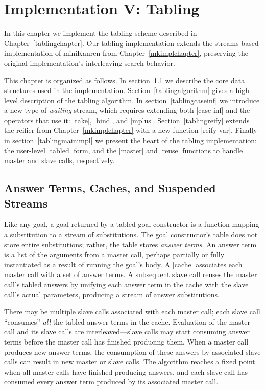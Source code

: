 \chapter{Implementation V: Tabling}\label{tablingimplchapter}

In this chapter we implement the tabling scheme described in
Chapter~\ref{tablingchapter}.  Our tabling implementation extends the
streams-based implementation of miniKanren from
Chapter~\ref{mkimplchapter}, preserving the original implementation's
interleaving search behavior.

This chapter is organized as follows.  In section~\ref{tablingrep} we
describe the core data structures used in the implementation.
Section~\ref{tablingalgorithm} gives a high-level description of the
tabling algorithm.  In section~\ref{tablingcaseinf} we introduce a new
type of \emph{waiting} stream, which requires extending both
\scheme|case-inf| and the operators that use it: \scheme|take|,
\scheme|bind|, and \scheme|mplus|.  Section~\ref{tablingreify} extends
the reifier from Chapter~\ref{mkimplchapter} with a new function
\scheme|reify-var|.  Finally in section~\ref{tablingmainimpl} we
present the heart of the tabling implementation: the user-level
\scheme|tabled| form, and the \scheme|master| and \scheme|reuse|
functions to handle master and slave calls, respectively.


\section{Answer Terms, Caches, and Suspended Streams}\label{tablingrep}

Like any goal, a goal returned by a tabled goal constructor is a
function mapping a substitution to a stream of substitutions.  The
goal constructor's table does not store entire substitutions; rather,
the table stores \emph{answer terms}.  An answer term is a list of the
arguments from a master call, perhaps partially or fully instantiated
as a result of running the goal's body.  A \scheme|cache| 
associates each master call with a set of answer terms.  A subsequent
slave call reuses the master call's tabled answers by unifying each
answer term in the cache with the slave call's actual parameters,
producing a stream of answer substitutions.

There may be multiple slave calls associated with each master call;
each slave call ``consumes'' \emph{all} the tabled answer terms in the
cache.  Evaluation of the master call and its slave calls are
interleaved---slave calls may start consuming answer terms before the
master call has finished producing them.  When a master call produces
new answer terms, the consumption of these answers by associated slave
calls can result in new master or slave calls.  The algorithm reaches
a fixed point when all master calls have finished producing answers,
and each slave call has consumed every answer term produced by its
associated master call.

